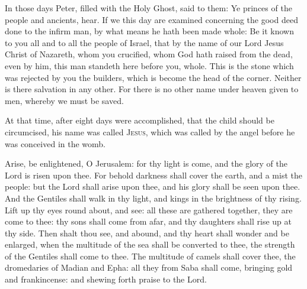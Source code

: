 



In those days Peter, filled with the Holy Ghost, said to them: Ye princes of the people
and ancients, hear.  If we this day are examined concerning the good deed done
to the infirm man, by what means he hath been made whole: Be it known to you
all and to all the people of Israel, that by the name of our Lord Jesus Christ
of Nazareth, whom you crucified, whom God hath raised from the dead, even by
him, this man standeth here before you, whole.  This is the stone which was
rejected by you the builders, which is become the head of the corner.  Neither
is there salvation in any other. For there is no other name under heaven given
to men, whereby we must be saved.



At that time, after eight days were accomplished, that the child should be circumcised,
his name was called \textsc{Jesus}, which was called by the angel before he was
conceived in the womb.






Arise, be enlightened, O Jerusalem: for thy light is come, and the glory of the
Lord is risen upon thee.  For behold darkness shall cover the earth, and a mist
the people: but the Lord shall arise upon thee, and his glory shall be seen
upon thee.  And the Gentiles shall walk in thy light, and kings in the
brightness of thy rising.  Lift up thy eyes round about, and see: all these are
gathered together, they are come to thee: thy sons shall come from afar, and
thy daughters shall rise up at thy side.  Then shalt thou see, and abound, and
thy heart shall wonder and be enlarged, when the multitude of the sea shall be
converted to thee, the strength of the Gentiles shall come to thee.  The
multitude of camels shall cover thee, the dromedaries of Madian and Epha: all
they from Saba shall come, bringing gold and frankincense: and shewing forth
praise to the Lord.



